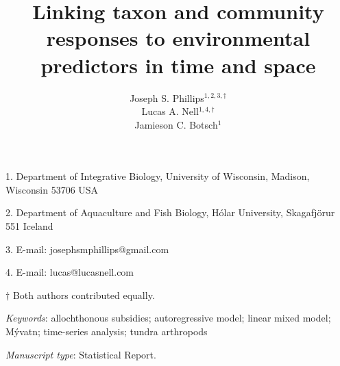 \documentclass[12pt]{article}
\title{Linking taxon and community responses to environmental
predictors in time and space}
\author{
Joseph S. Phillips$^{1,2,3,\dagger}$ \\
Lucas A. Nell$^{1,4,\dagger}$ \\
Jamieson C. Botsch$^{1}$}
\date{}
\begin{document}
\raggedright
\setlength\parindent{0.25in}

\maketitle


\noindent{} 1. Department of Integrative Biology, University of Wisconsin, Madison, Wisconsin 53706 USA

\noindent{} 2. Department of Aquaculture and Fish Biology, H\'{o}lar University, Skagafj\"{o}r{\dh}ur 551 Iceland

\noindent{} 3. E-mail: josephsmphillips@gmail.com

\noindent{} 4. E-mail: lucas@lucasnell.com

\noindent{} $\dagger$ Both authors contributed equally.



\bigskip


\bigskip


\textit{Keywords}: {allochthonous subsidies; autoregressive model; linear mixed model;
M\'{y}vatn; time-series analysis; tundra arthropods
}


\bigskip

\textit{Manuscript type}: Statistical Report.


\linenumbers{}

\newpage{}





\newpage{}



\end{document}
